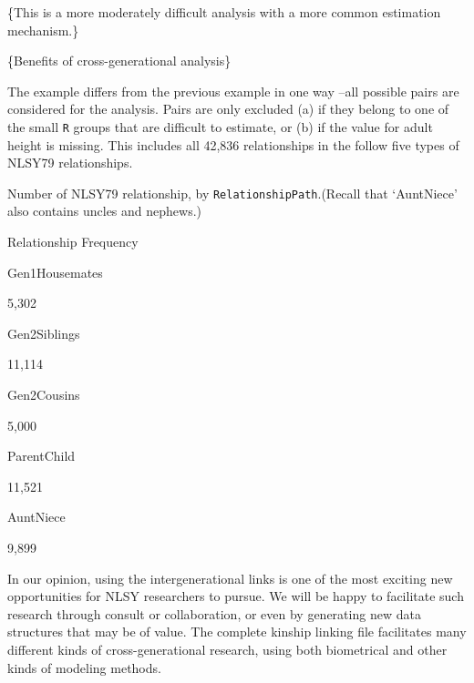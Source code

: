 \documentclass[smallextended]{svjour3}       %
\newenvironment{Shaded}{\begin{snugshade}}{\end{snugshade}}
\newcommand{\DataTypeTok}[1]{\textcolor[rgb]{0.13,0.29,0.53}{#1}}
\newcommand{\KeywordTok}[1]{\textcolor[rgb]{0.13,0.29,0.53}{\textbf{#1}}}
\newcommand{\NormalTok}[1]{#1}
\newcommand{\OperatorTok}[1]{\textcolor[rgb]{0.81,0.36,0.00}{\textbf{#1}}}
\newcommand{\StringTok}[1]{\textcolor[rgb]{0.31,0.60,0.02}{#1}}
\begin{document}
\{This is a more moderately difficult analysis with a more common
estimation mechanism.\}

\{Benefits of cross-generational analysis\}

The example differs from the previous example in one way --all possible
pairs are considered for the analysis. Pairs are only excluded (a) if
they belong to one of the small \texttt{R} groups that are difficult to
estimate, or (b) if the value for adult height is missing. This includes
all 42,836 relationships in the follow five types of NLSY79
relationships.

\begin{Shaded}
\end{Shaded}

Number of NLSY79 relationship, by \texttt{RelationshipPath}.(Recall that
`AuntNiece' also contains uncles and nephews.)

Relationship Frequency

Gen1Housemates

5,302

Gen2Siblings

11,114

Gen2Cousins

5,000

ParentChild

11,521

AuntNiece

9,899

In our opinion, using the intergenerational links is one of the most
exciting new opportunities for NLSY researchers to pursue. We will be
happy to facilitate such research through consult or collaboration, or
even by generating new data structures that may be of value. The
complete kinship linking file facilitates many different kinds of
cross-generational research, using both biometrical and other kinds of
modeling methods.
\end{document}
